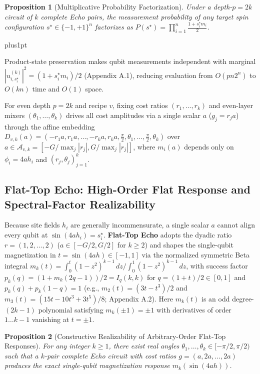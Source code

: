 \documentclass{article}
\makeatletter
\renewenvironment{proof}[1][\proofname]{\par
  \pushQED{\qed}%
  \normalfont \topsep1pt plus1pt\relax
  \trivlist
  \item[\hskip\labelsep
        \itshape
    #1\@addpunct{.}]\ignorespaces
}{%
  \popQED\endtrivlist\@endpefalse
}
\theoremstyle{plain}
\newtheorem{proposition}{Proposition}
\theoremstyle{definition}
\makeatother
\begin{document}
\begin{proposition}[Multiplicative Probability Factorization]
\label{prop:2}
Under a depth-$p=2k$ circuit of $k$ complete Echo pairs, the measurement probability of any target spin configuration $s^\star\in\{-1,+1\}^n$ factorizes as $P(s^\star)=\prod_{i=1}^n\frac{1+s_i^\star m_i}{2}$.
\end{proposition}

\begin{proof}[Proof Sketch]
Product-state preservation makes qubit measurements independent with marginal $|u_{i,s_i^\star}^{(k)}|^2=(1+s_i^\star m_i)/2$ (Appendix A.1), reducing evaluation from $O(pn2^n)$ to $O(kn)$ time and $O(1)$ space.
\end{proof}

For even depth $p=2k$ and recipe $v$, fixing cost ratios $(r_1,\ldots,r_k)$ and even-layer mixers $(\theta_1,\ldots,\theta_k)$ drives all cost amplitudes via a single scalar $a$ ($g_j=r_ja$) through the affine embedding $D_{v,k}(a)=(-r_1a,r_1a,\ldots,-r_ka,r_ka,\tfrac\pi2,\theta_1,\ldots,\tfrac\pi2,\theta_k)$ over $a\in\mathcal A_{v,k}=[-G/\max_j|r_j|,G/\max_j|r_j|]$, where $m_i(a)$ depends only on $\phi_i=4ah_i$ and $(r_j,\theta_j)_{j=1}^k$.


\subsection{Flat-Top Echo: High-Order Flat Response and Spectral-Factor Realizability}\label{subsec:3_3}

Because site fields $h_i$ are generally incommensurate, a single scalar $a$ cannot align every qubit at $\sin(4ah_i)=s_i^\star$. \textbf{Flat-Top Echo} adopts the dyadic ratio $r=(1,2,\ldots,2)$ ($a\in[-G/2,G/2]$ for $k\ge 2$) and shapes the single-qubit magnetization in $t=\sin(4ah)\in[-1,1]$ via the normalized symmetric Beta integral $m_k(t)=\int_0^t(1-z^2)^{k-1}\,dz/\int_0^1(1-z^2)^{k-1}\,dz$, with success factor $p_k(q)=(1+m_k(2q-1))/2=I_q(k,k)$ for $q=(1+t)/2\in[0,1]$ and $p_k(q)+p_k(1-q)=1$ (e.g., $m_2(t)=(3t-t^3)/2$ and $m_3(t)=(15t-10t^3+3t^5)/8$; Appendix A.2). Here $m_k(t)$ is an odd degree-$(2k-1)$ polynomial satisfying $m_k(\pm 1)=\pm 1$ with derivatives of order $1\ldots k-1$ vanishing at $t=\pm 1$.

\begin{proposition}[Constructive Realizability of Arbitrary-Order Flat-Top Responses]
\label{prop:3}
For any integer $k\ge 1$, there exist real angles $\theta_1,\ldots,\theta_k\in[-\pi/2,\pi/2)$ such that a $k$-pair complete Echo circuit with cost ratios $g=(a,2a,\ldots,2a)$ produces the exact single-qubit magnetization response $m_k(\sin(4ah))$.
\end{proposition}
\end{document}
